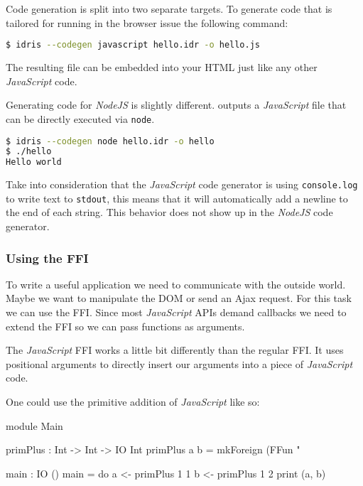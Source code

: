 \noindent
Code generation is split into two separate targets. To generate code that is
tailored for running in the browser issue the following command:

\begin{lstlisting}[language=bash]
$ idris --codegen javascript hello.idr -o hello.js
\end{lstlisting}

\noindent
The resulting file can be embedded into your HTML just like any other
\emph{JavaScript} code.

\noindent
Generating code for \emph{NodeJS} is slightly different. \Idris{} outputs
a \emph{JavaScript} file that can be directly executed via \texttt{node}.

\begin{lstlisting}[language=bash]
$ idris --codegen node hello.idr -o hello
$ ./hello
Hello world
\end{lstlisting}

\noindent
Take into consideration that the \emph{JavaScript} code generator is using
\texttt{console.log} to write text to \texttt{stdout}, this means that it will
automatically add a newline to the end of each string. This behavior
does not show up in the \emph{NodeJS} code generator.

\subsubsection*{Using the FFI}

\noindent
To write a useful application we need to communicate with the outside
world. Maybe we want to manipulate the DOM or send an Ajax request. For this
task we can use the FFI. Since most \emph{JavaScript} APIs demand callbacks
we need to extend the FFI so we can pass functions as arguments.

\noindent
The \emph{JavaScript} FFI works a little bit differently than the regular FFI.
It uses positional arguments to directly insert our arguments into a piece
of \emph{JavaScript} code.

\noindent
One could use the primitive addition of \emph{JavaScript} like so:

\begin{code}
module Main

primPlus : Int -> Int -> IO Int
primPlus a b = mkForeign (FFun "%

main : IO ()
main = do
  a <- primPlus 1 1
  b <- primPlus 1 2
  print (a, b)
\end{code}

